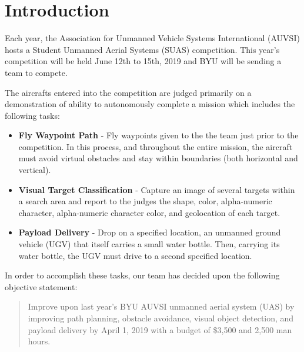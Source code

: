 \documentclass{auvsi_doc}
\begin{document}
\begin{AUVSITitlePage}
\begin{artifacttable}
\end{artifacttable}
\end{AUVSITitlePage}


\section{ Introduction}

Each year, the Association for Unmanned Vehicle Systems International (AUVSI) hosts a Student Unmanned Aerial Systems (SUAS) competition. This year’s competition will be held June 12th to 15th, 2019 and BYU will be sending a team to compete.

The aircrafts entered into the competition are judged primarily on a demonstration of ability to autonomously complete a mission which includes the following tasks:

\begin{itemize}
	\item\textbf{Fly Waypoint Path} - Fly waypoints given to the the team just prior to the competition. In this process, and throughout the entire mission, the aircraft must avoid virtual obstacles and stay within boundaries (both horizontal and vertical).
	\item\textbf{Visual Target Classification} - Capture an image of several targets within a search area and report to the judges the shape, color, alpha-numeric character, alpha-numeric character color, and geolocation of each target.
	\item\textbf{Payload Delivery} - Drop on a specified location, an unmanned ground vehicle (UGV) that itself carries a small water bottle. Then, carrying its water bottle, the UGV must drive to a second specified location.
\end{itemize}

In order to accomplish these tasks, our team has decided upon the following objective statement:

\begin{quote}
Improve upon last year’s BYU AUVSI unmanned aerial system (UAS) by improving path planning, obstacle avoidance, visual object detection, and payload delivery by April 1, 2019 with a budget of \$3,500 and 2,500 man hours.
\end{quote}
\end{document}
